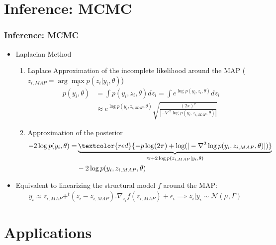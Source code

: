 \documentclass[xcolor={dvipsnames}]{beamer}
\begin{document}
\section{Inference: MCMC}

\begin{frame}
\frametitle{Inference: MCMC}

\begin{itemize}
\item Laplacian Method
  \begin{enumerate}
    \item Laplace Approximation of the incomplete likelihood around the MAP ($z_{i,MAP} = \arg \max \limits_{z} p(z_i|y_i,\theta)$)
    \begin{align}
    p(y_i,\theta) & = \int{p(y_i,z_i,\theta) dz_i} = \int{e^{\log p(y_i,z_i,\theta)} dz_i}\\
    & \approx e^{\log p(y_i,z_{i,MAP},\theta)} \sqrt{\frac{(2\pi)^p}{|-\nabla^2\log p(y_i,z_{i,MAP},\theta)|}}
    \end{align}
    \item Approximation of the posterior
    \begin{align}
    -2 \log p(y_i,\theta) = & \underbrace{\textcolor{red}{-p \log(2\pi) +\log(|-\nabla^2\log p(y_i,z_{i,MAP},\theta)|)}}_{\approx +2\log p(z_{i,MAP}|y_i,\theta)} \\
    & -2\log p(y_i,z_{i,MAP},\theta)
    \end{align}
  \end{enumerate} 
\item Equivalent to linearizing the structural model $f$ around the MAP:
\begin{align}
y_i \approx z_{i,MAP} + ^{t}(z_i - z_{i,MAP}).\nabla_{z_i} f(z_{i,MAP}) + \epsilon_i \implies z_i|y_i \sim \mathcal{N}(\mu, \Gamma)
\end{align}



\end{itemize}

\end{frame}




\section{Applications}
\end{document}
